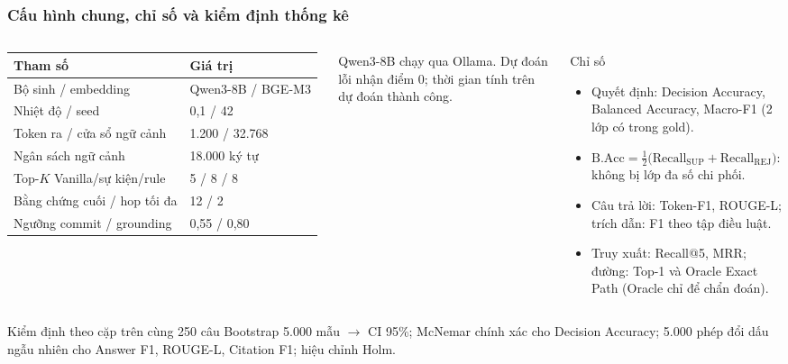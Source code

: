 \begin{frame}
\frametitle{Cấu hình chung, chỉ số và kiểm định thống kê}
\begin{columns}[T,onlytextwidth]
\scriptsize
\renewcommand{\arraystretch}{1.25}
\setlength{\tabcolsep}{4pt}
\begin{tabular}{@{}l l@{}}
\toprule
\textbf{Tham số} & \textbf{Giá trị}\\
\midrule
Bộ sinh / embedding & Qwen3-8B / BGE-M3\\
Nhiệt độ / seed & 0,1 / 42\\
Token ra / cửa sổ ngữ cảnh & 1.200 / 32.768\\
Ngân sách ngữ cảnh & 18.000 ký tự\\
Top-$K$ Vanilla/sự kiện/rule & 5 / 8 / 8\\
Bằng chứng cuối / hop tối đa & 12 / 2\\
Ngưỡng commit / grounding & 0,55 / 0,80\\
\bottomrule
\end{tabular}

\vspace{0.1cm}
{\scriptsize\color{schemaGray} Qwen3-8B chạy qua Ollama. Dự đoán lỗi nhận điểm 0; thời gian tính trên dự đoán thành công.\par}

\begin{block}{Chỉ số}
\footnotesize
\begin{itemize}
  \item Quyết định: Decision Accuracy, Balanced Accuracy, Macro-F1 (2 lớp có trong gold).
  \item $\text{B.Acc}=\tfrac12\big(\text{Recall}_{\text{SUP}}+\text{Recall}_{\text{REJ}}\big)$:
        \dien không bị lớp đa số chi phối.
  \item Câu trả lời: Token-F1, ROUGE-L; trích dẫn: F1 theo tập điều luật.
  \item Truy xuất: Recall@5, MRR; đường: Top-1 và Oracle Exact Path (Oracle chỉ để chẩn đoán).
\end{itemize}
\end{block}
\end{columns}

\vspace{0.1cm}
\begin{block}{Kiểm định theo cặp trên cùng 250 câu}
\footnotesize Bootstrap 5.000 mẫu $\rightarrow$ CI 95\%; McNemar chính xác cho Decision Accuracy;
5.000 phép đổi dấu ngẫu nhiên cho Answer F1, ROUGE-L, Citation F1; hiệu chỉnh Holm.
\end{block}
\end{frame}
